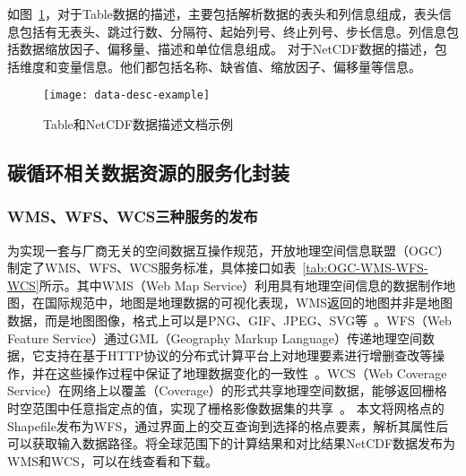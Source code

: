 如图~\ref{fig:data-desc-example}，对于Table数据的描述，主要包括解析数据的表头和列信息组成，表头信息包括有无表头、跳过行数、分隔符、起始列号、终止列号、步长信息。列信息包括数据缩放因子、偏移量、描述和单位信息组成。
对于NetCDF数据的描述，包括维度和变量信息。他们都包括名称、缺省值、缩放因子、偏移量等信息。

\begin{figure}[!htbp]
    \centering
    \texttt{[image: data-desc-example]}
    \caption{Table和NetCDF数据描述文档示例}
    \label{fig:data-desc-example}
\end{figure}

\subsection{碳循环相关数据资源的服务化封装}
\label{sec:data-service}
\subsubsection{WMS、WFS、WCS三种服务的发布}
\label{subsubsec:OGC}
为实现一套与厂商无关的空间数据互操作规范，开放地理空间信息联盟（OGC）制定了WMS、WFS、WCS服务标准，具体接口如表~\ref{tab:OGC-WMS-WFS-WCS}所示。其中WMS（Web Map Service）利用具有地理空间信息的数据制作地图，在国际规范中，地图是地理数据的可视化表现，WMS返回的地图并非是地图数据，而是地图图像，格式上可以是PNG、GIF、JPEG、SVG等~\cite{OGC-WMS}。WFS（Web Feature Service）通过GML（Geography Markup Language）传递地理空间数据，它支持在基于HTTP协议的分布式计算平台上对地理要素进行增删查改等操作，并在这些操作过程中保证了地理数据变化的一致性~\cite{OGC-WFS}。WCS（Web Coverage Service）在网络上以覆盖（Coverage）的形式共享地理空间数据，能够返回栅格时空范围中任意指定点的值，实现了栅格影像数据集的共享~\cite{OGC-WCS}。
本文将网格点的Shapefile发布为WFS，通过界面上的交互查询到选择的格点要素，解析其属性后可以获取输入数据路径。将全球范围下的计算结果和对比结果NetCDF数据发布为WMS和WCS，可以在线查看和下载。

